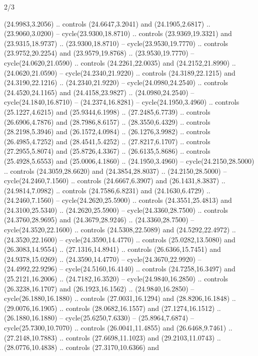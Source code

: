 \begin{flagdescription}{2/3}
\begin{scope}[yshift=\flagwidth,scale=\flagwidth/1241.93737]
\begin{scope}[y=-1mm, x=1mm,draw=gold,fill=blue,line join=miter,miter limit=4,line width=1.8\lw]
\begin{scope}[y=1mm, x=1mm, yscale=-1,shift={(573.68mm+\str,145.75)}]
\begin{scope}[scale=1.35,shift={(-9,-3)}]
\begin{scope}[scale=0.55]
\begin{scope}[scale=1.333]
    (24.9983,3.2056) .. controls (24.6647,3.2041) and (24.1905,2.6817) ..
    (23.9060,3.0200) -- cycle(23.9300,18.8710) .. controls (23.9369,19.3321) and
    (23.9315,18.9737) .. (23.9300,18.8710) -- cycle(23.9530,19.7770) .. controls
    (23.9752,20.2254) and (23.9579,19.8768) .. (23.9530,19.7770) --
    cycle(24.0620,21.0590) .. controls (24.2261,22.0035) and (24.2152,21.8990) ..
    (24.0620,21.0590) -- cycle(24.2340,21.9220) .. controls (24.3189,22.1215) and
    (24.3190,22.1216) .. (24.2340,21.9220) -- cycle(24.0980,24.2540) .. controls
    (24.4520,24.1165) and (24.4158,23.9827) .. (24.0980,24.2540) --
    cycle(24.1840,16.8710) -- (24.2374,16.8281) -- cycle(24.1950,3.4960) ..
    controls (25.1227,4.6215) and (25.9344,6.1998) .. (27.2485,6.7739) .. controls
    (26.6906,4.7876) and (28.7986,8.6157) .. (28.3550,6.4329) .. controls
    (28.2198,5.3946) and (26.1572,4.0984) .. (26.1276,3.9982) .. controls
    (26.4985,4.7252) and (28.4541,5.4252) .. (27.8217,6.1707) .. controls
    (27.2955,5.8074) and (25.8726,4.3367) .. (26.6135,5.8686) .. controls
    (25.4928,5.6553) and (25.0006,4.1860) .. (24.1950,3.4960) --
    cycle(24.2150,28.5000) .. controls (24.3059,28.6620) and (24.3854,28.8037) ..
    (24.2150,28.5000) -- cycle(24.2460,7.1560) .. controls (24.6667,6.3907) and
    (26.1431,8.3837) .. (24.9814,7.0982) .. controls (24.7586,6.8231) and
    (24.1630,6.4729) .. (24.2460,7.1560) -- cycle(24.2620,25.5900) .. controls
    (24.3551,25.4813) and (24.3100,25.5340) .. (24.2620,25.5900) --
    cycle(24.3360,28.7500) .. controls (24.3760,28.9695) and (24.3679,28.9246) ..
    (24.3360,28.7500) -- cycle(24.3520,22.1600) .. controls (24.5308,22.5089) and
    (24.5292,22.4972) .. (24.3520,22.1600) -- cycle(24.3590,14.4770) .. controls
    (25.0282,13.5080) and (26.3083,14.9554) .. (27.1316,14.8941) .. controls
    (26.6366,15.7451) and (24.9378,15.0269) .. (24.3590,14.4770) --
    cycle(24.3670,22.9920) -- (24.4992,22.9296) -- cycle(24.5160,16.4140) ..
    controls (24.7258,16.3497) and (25.2121,16.2006) .. (24.7182,16.3520) --
    cycle(24.9840,16.2850) .. controls (26.3238,16.1707) and (26.1923,16.1562) ..
    (24.9840,16.2850) -- cycle(26.1880,16.1880) .. controls (27.0031,16.1294) and
    (28.8206,16.1848) .. (29.0076,16.1905) .. controls (28.0682,16.1557) and
    (27.1274,16.1512) .. (26.1880,16.1880) -- cycle(25.6250,7.6330) --
    (25.8964,7.6874) -- cycle(25.7300,10.7070) .. controls (26.0041,11.4855) and
    (26.6468,9.7461) .. (27.2148,10.7883) .. controls (27.6698,11.1023) and
    (29.2103,11.0743) .. (28.0776,10.4838) .. controls (27.3170,10.6366) and

\end{scope}
\end{scope}
\end{scope}
\end{scope}
\end{scope}
\end{scope}
\end{flagdescription}
